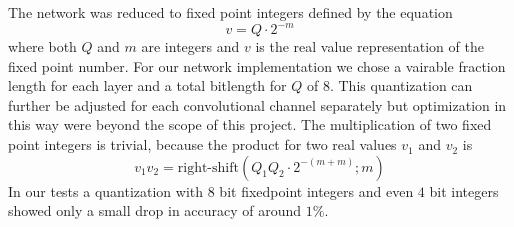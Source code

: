 The network was reduced to fixed point integers defined by the equation
\begin{equation}
	v = Q \cdot 2 ^{-m}
\end{equation}
where both $Q$ and $m$ are integers and $v$ is the real value representation of the fixed point number. 
For our network implementation we chose a vairable fraction length for each layer and a total bitlength for $Q$ of $8$. 
This quantization can further be adjusted for each convolutional channel separately but optimization in this way were beyond the scope of this project.
The multiplication of two fixed point integers is trivial, because the product for two real values $v_1$ and $v_2$ is 
\begin{equation}
	v_1 v_2 = \text{right-shift}\left( Q_1 Q_2 \cdot 2^{-(m+m)} ; m\right)
\end{equation}
In our tests a quantization with $8$ bit fixedpoint integers and even $4$ bit integers showed only a small drop in accuracy of around $1 \%$.


